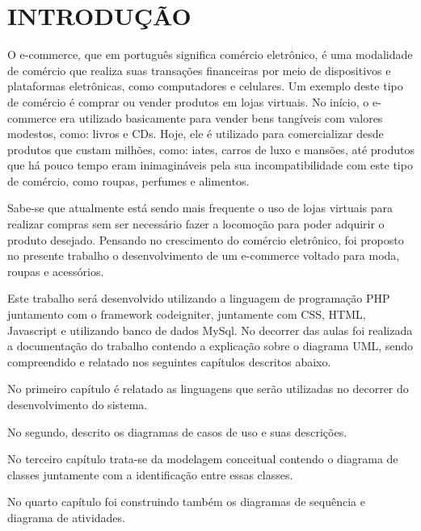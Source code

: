 
\chapter{INTRODUÇÃO}
\label{chap:introducao}


O e-commerce, que em português significa comércio eletrônico, é uma modalidade de comércio que realiza suas transações financeiras por meio de dispositivos e plataformas eletrônicas, como computadores e celulares. Um exemplo deste tipo de comércio é comprar ou vender produtos em lojas virtuais. 
No início, o e-commerce era utilizado basicamente para vender bens tangíveis com valores modestos, como: livros e CDs. Hoje, ele é utilizado para comercializar desde produtos que custam milhões, como: iates, carros de luxo e mansões, até produtos que há pouco tempo eram inimagináveis pela sua incompatibilidade com este tipo de comércio, como roupas, perfumes e alimentos. \cite{ecomm} %


Sabe-se que atualmente está sendo mais frequente o uso de lojas virtuais para realizar compras sem ser necessário fazer a locomoção para poder adquirir o produto desejado. Pensando no crescimento do comércio eletrônico, foi proposto no presente trabalho o desenvolvimento de um e-commerce voltado para moda, roupas e acessórios. 

Este trabalho será desenvolvido utilizando a linguagem de programação PHP juntamento com o framework codeigniter, juntamente com CSS, HTML, Javascript e  utilizando banco de dados MySql.
No decorrer das aulas foi realizada a documentação do trabalho contendo a explicação sobre o diagrama UML, sendo compreendido e relatado nos seguintes capítulos descritos abaixo.

No primeiro capítulo é relatado as linguagens que serão utilizadas no decorrer do desenvolvimento do sistema.

No segundo, descrito os diagramas de casos de uso e suas descrições.

No terceiro capítulo trata-se da modelagem conceitual contendo o diagrama de classes juntamente com a identificação entre essas classes.

No quarto capítulo foi construindo também os diagramas de sequência e diagrama de atividades.


